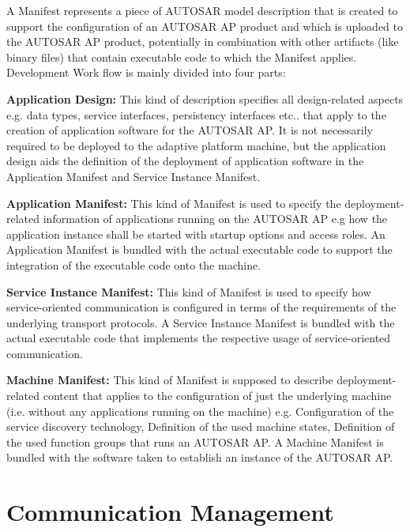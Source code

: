 A Manifest represents a piece of A\+U\+T\+O\+S\+AR model description that is created to support the configuration of an A\+U\+T\+O\+S\+AR AP product and which is uploaded to the A\+U\+T\+O\+S\+AR AP product, potentially in combination with other artifacts (like binary files) that contain executable code to which the Manifest applies.  Development Work flow is mainly divided into four parts\+:


\begin{DoxyItemize}
\item {\bfseries Application Design\+:} This kind of description specifies all design-\/related aspects e.\+g. data types, service interfaces, persistency interfaces etc.. that apply to the creation of application software for the A\+U\+T\+O\+S\+AR AP. It is not necessarily required to be deployed to the adaptive platform machine, but the application design aids the definition of the deployment of application software in the Application Manifest and Service Instance Manifest.
\item {\bfseries Application Manifest\+:} This kind of Manifest is used to specify the deployment-\/related information of applications running on the A\+U\+T\+O\+S\+AR AP e.\+g how the application instance shall be started with startup options and access roles. An Application Manifest is bundled with the actual executable code to support the integration of the executable code onto the machine.
\item {\bfseries Service Instance Manifest\+:} This kind of Manifest is used to specify how service-\/oriented communication is configured in terms of the requirements of the underlying transport protocols. A Service Instance Manifest is bundled with the actual executable code that implements the respective usage of service-\/oriented communication.
\item {\bfseries Machine Manifest\+:} This kind of Manifest is supposed to describe deployment-\/related content that applies to the configuration of just the underlying machine (i.\+e. without any applications running on the machine) e.\+g. Configuration of the service discovery technology, Definition of the used machine states, Definition of the used function groups that runs an A\+U\+T\+O\+S\+AR AP. A Machine Manifest is bundled with the software taken to establish an instance of the A\+U\+T\+O\+S\+AR AP. 
\end{DoxyItemize}\hypertarget{adaptive_communicationmanagement}{}\section{Communication Management}\label{adaptive_communicationmanagement}

